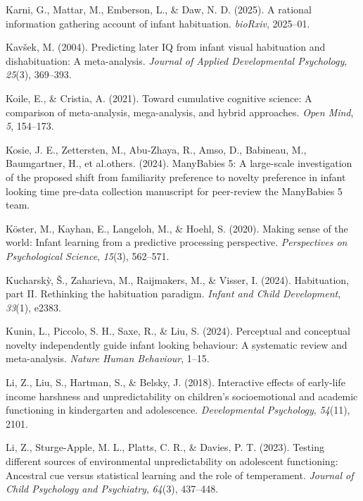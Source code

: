 \documentclass[10pt, letterpaper]{article}
\newenvironment{CSLReferences}%
  {}%
  {\par}
\begin{document}
\begin{CSLReferences}{1}{0}
\leavevmode{}%
Karni, G., Mattar, M., Emberson, L., \& Daw, N. D. (2025). A rational
information gathering account of infant habituation. \emph{bioRxiv},
2025--01.

\leavevmode{}%
Kavšek, M. (2004). Predicting later IQ from infant visual habituation
and dishabituation: A meta-analysis. \emph{Journal of Applied
Developmental Psychology}, \emph{25}(3), 369--393.

\leavevmode{}%
Koile, E., \& Cristia, A. (2021). Toward cumulative cognitive science: A
comparison of meta-analysis, mega-analysis, and hybrid approaches.
\emph{Open Mind}, \emph{5}, 154--173.

\leavevmode{}%
Kosie, J. E., Zettersten, M., Abu-Zhaya, R., Amso, D., Babineau, M.,
Baumgartner, H., et al.others. (2024). ManyBabies 5: A large-scale
investigation of the proposed shift from familiarity preference to
novelty preference in infant looking time pre-data collection manuscript
for peer-review the ManyBabies 5 team.

\leavevmode{}%
Köster, M., Kayhan, E., Langeloh, M., \& Hoehl, S. (2020). Making sense
of the world: Infant learning from a predictive processing perspective.
\emph{Perspectives on Psychological Science}, \emph{15}(3), 562--571.

\leavevmode{}%
Kucharskỳ, Š., Zaharieva, M., Raijmakers, M., \& Visser, I. (2024).
Habituation, part II. Rethinking the habituation paradigm. \emph{Infant
and Child Development}, \emph{33}(1), e2383.

\leavevmode{}%
Kunin, L., Piccolo, S. H., Saxe, R., \& Liu, S. (2024). Perceptual and
conceptual novelty independently guide infant looking behaviour: A
systematic review and meta-analysis. \emph{Nature Human Behaviour},
1--15.

\leavevmode{}%
Li, Z., Liu, S., Hartman, S., \& Belsky, J. (2018). Interactive effects
of early-life income harshness and unpredictability on children's
socioemotional and academic functioning in kindergarten and adolescence.
\emph{Developmental Psychology}, \emph{54}(11), 2101.

\leavevmode{}%
Li, Z., Sturge-Apple, M. L., Platts, C. R., \& Davies, P. T. (2023).
Testing different sources of environmental unpredictability on
adolescent functioning: Ancestral cue versus statistical learning and
the role of temperament. \emph{Journal of Child Psychology and
Psychiatry}, \emph{64}(3), 437--448.


\end{CSLReferences}
\end{document}
